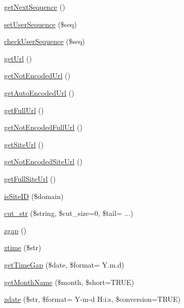 \begin{DoxyCompactItemize}
\item 
\hyperlink{func_8inc_8php_a5a97b458f9c5b4fe3574671840aee27c}{get\+Next\+Sequence} ()
\item 
\hyperlink{func_8inc_8php_aa3832c4893dae39987cf056c24c29392}{set\+User\+Sequence} (\$seq)
\item 
\hyperlink{func_8inc_8php_a56536fb66de4e320aaac07b82e6c2e21}{check\+User\+Sequence} (\$seq)
\item 
\hyperlink{func_8inc_8php_accd14bda49a1044b4d8dd93f020f11ee}{get\+Url} ()
\item 
\hyperlink{func_8inc_8php_aa73dbeb07c5bcac26c24fe4c6b05d8d2}{get\+Not\+Encoded\+Url} ()
\item 
\hyperlink{func_8inc_8php_a77e631a54eea5ecea3a77feb56129104}{get\+Auto\+Encoded\+Url} ()
\item 
\hyperlink{func_8inc_8php_acaf8f155dd27e065b7fb0f5c3f702027}{get\+Full\+Url} ()
\item 
\hyperlink{func_8inc_8php_a06116450c538bd1f67cf3209bfd16610}{get\+Not\+Encoded\+Full\+Url} ()
\item 
\hyperlink{func_8inc_8php_a2d80ea9652d1586d5dcd03d022150f73}{get\+Site\+Url} ()
\item 
\hyperlink{func_8inc_8php_aa09cef59156d4afaeee54a675605f95d}{get\+Not\+Encoded\+Site\+Url} ()
\item 
\hyperlink{func_8inc_8php_a778b55fa9ebcf9a5ef0b017b998d9894}{get\+Full\+Site\+Url} ()
\item 
\hyperlink{func_8inc_8php_aa85a46b82e60cc2c64682ea6464eeeff}{is\+Site\+I\+D} (\$domain)
\item 
\hyperlink{func_8inc_8php_ad7b240a38cc63f3a576d4b7c391fda16}{cut\+\_\+str} (\$string, \$cut\+\_\+size=0, \$tail= \textquotesingle{}...\textquotesingle{})
\item 
\hyperlink{func_8inc_8php_acac2e71b99c40a4736c3ba62c0b8ac70}{zgap} ()
\item 
\hyperlink{func_8inc_8php_afa835b7d80cf54db78fd0cb7d81c7968}{ztime} (\$str)
\item 
\hyperlink{func_8inc_8php_a8c68983e66e199e8b7f1b5dad8f0c3ab}{get\+Time\+Gap} (\$date, \$format= \textquotesingle{}Y.\+m.\+d\textquotesingle{})
\item 
\hyperlink{func_8inc_8php_adc2ced210718f27abac98392564a7b82}{get\+Month\+Name} (\$month, \$short=T\+R\+U\+E)
\item 
\hyperlink{func_8inc_8php_acccf91c81ea5145f4704bdd53421917b}{zdate} (\$str, \$format= \textquotesingle{}Y-\/m-\/d H\+:i\+:s\textquotesingle{}, \$conversion=T\+R\+U\+E)

\end{DoxyCompactItemize}
